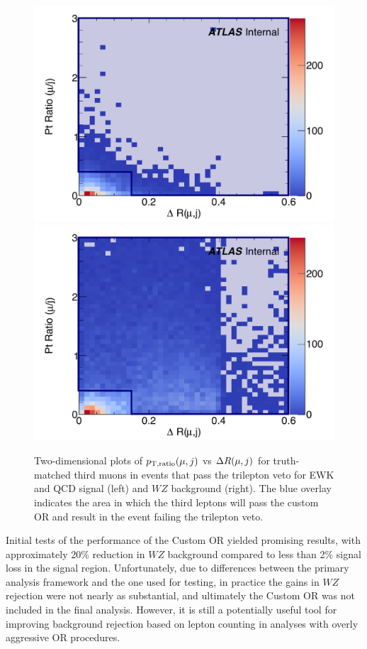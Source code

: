 \begin{figure}[htbp]
  \centering
  \includegraphics[width=.48\textwidth]{figs/ssww_13tev/custom_or/sig_Muon_DR_PtRatio_edited}
  \includegraphics[width=.48\textwidth]{figs/ssww_13tev/custom_or/bkg_Muon_DR_PtRatio_edited}
  \caption{Two-dimensional plots of $p_{\textrm{T},\textrm{ratio}}(\mu,j)$ vs $\Delta R(\mu,j)$ for truth-matched third muons in events that pass the trilepton veto for EWK and QCD \ssww signal (left) and $WZ$ background (right).  The blue overlay indicates the area in which the third leptons will pass the custom OR and result in the event failing the trilepton veto.}
  \label{fig:ssww13tev_customor_muon_2d}
\end{figure}

Initial tests of the performance of the Custom OR yielded promising results, with approximately 20\% reduction in $WZ$ background compared to less than 2\% signal loss in the signal region.
Unfortunately, due to differences between the primary analysis framework and the one used for testing, in practice the gains in $WZ$ rejection were not nearly as substantial, and ultimately the Custom OR was not included in the final analysis.
However, it is still a potentially useful tool for improving background rejection based on lepton counting in analyses with overly aggressive OR procedures.
